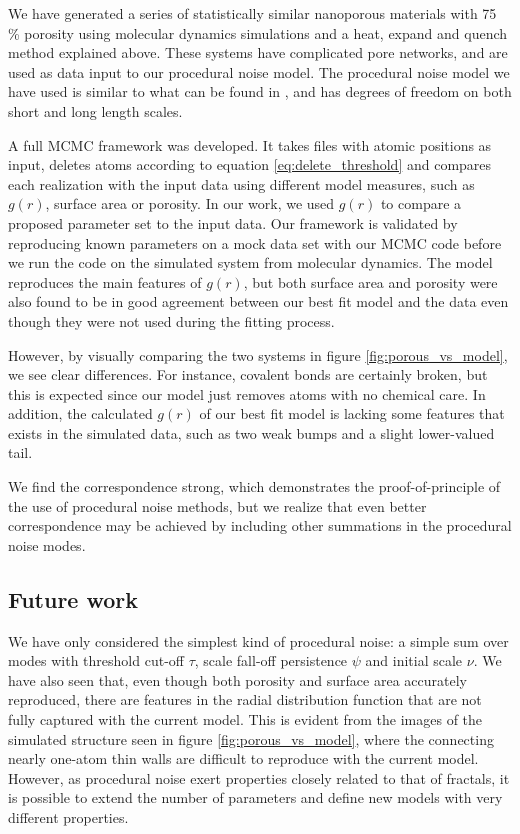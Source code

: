 \documentclass[aps,pre,twocolumn,letterpaper,floatfix,showpacs]{revtex4}
\begin{document}
We have generated a series of statistically similar nanoporous materials with 75 \% porosity using molecular dynamics simulations and a heat, expand and quench method explained above.
These systems have complicated pore networks, and are used as data input to our procedural noise model.
The procedural noise model we have used is similar to what can be found in \cite{groeneboom:2014}, and has degrees of freedom on both short and long length scales.

A full MCMC framework was developed. It takes files with atomic positions as input, deletes atoms according to equation \eqref{eq:delete_threshold} and compares each realization with the input data using different model measures, such as $g(r)$, surface area or porosity.
In our work, we used $g(r)$ to compare a proposed parameter set to the input data.
Our framework is validated by reproducing known parameters on a mock data set with our MCMC code before we run the code on the simulated system from molecular dynamics.
The model reproduces the main features of $g(r)$, but both surface area and porosity were also found to be in good agreement between our best fit model and the data even though they were not used during the fitting process.

However, by visually comparing the two systems in figure \ref{fig:porous_vs_model}, we see clear differences. For instance, covalent bonds are certainly broken, but this is expected since our model just removes atoms with no chemical care.
In addition, the calculated $g(r)$ of our best fit model is lacking some features that exists in the simulated data, such as two weak bumps and a slight lower-valued tail.

We find the correspondence strong, which demonstrates the proof-of-principle of the use of
procedural noise methods, but we realize that even better correspondence may be achieved by including other summations in the procedural noise modes.

\subsection{Future work}
We have only considered the simplest kind of procedural noise: a simple sum over modes with
threshold cut-off $\tau$, scale fall-off persistence $\psi$ and initial scale $\nu$. 
We have also seen that, even though both porosity and surface area accurately reproduced,
there are features in the radial distribution function that are not fully captured with the current model. 
This is evident from the images of the simulated structure seen in figure \ref{fig:porous_vs_model},
where the connecting nearly one-atom thin walls are difficult to reproduce with the current model. 
However, as procedural noise exert properties closely related to that of fractals, it is possible
to extend the number of parameters and define new models with very different properties. 
\end{document}
